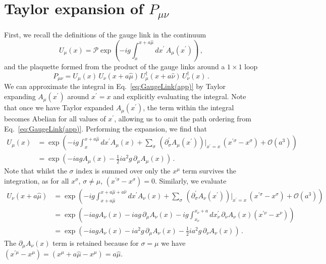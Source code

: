 \section{Taylor expansion of $P_{\mu\nu}$}\label{app:TEPlaquette}
First, we recall the definitions of the gauge link in the continuum
%
\begin{equation}
U_\mu(x) = \mathcal{P}\exp\left(-ig\int_x^{x+a\hat{\mu}}dx^\prime \, A_\mu(x^\prime)\right)  \, ,
\label{eq:GaugeLink(app)}
\end{equation}
%
and the plaquette formed from the product of the gauge links around a $1\times 1$ loop
\begin{equation}
P_{\mu\nu} = U_\mu(x)\,U_\nu(x+a\hat{\mu})\,U^\dagger_\mu(x+a\hat{\nu})\,U^\dagger_\nu(x)\, .
\label{eq:Plaquette(app)}
\end{equation}
%
We can approximate the integral in Eq.~\eqref{eq:GaugeLink(app)} by Taylor expanding $A_\mu(x^\prime)$ around $x^\prime=x$ and explicitly evaluating the integral. Note that once we have Taylor expanded $A_\mu(x^\prime)$, the term within the integral becomes Abelian for all values of $x^\prime$, allowing us to omit the path ordering from Eq.~\eqref{eq:GaugeLink(app)}. Performing the expansion, we find that
%
\begin{align}
U_\mu(x)&=\exp\left(-ig\int_x^{x+a\hat{\mu}} dx^\prime A_\mu\left(x\right) + \sum_\sigma \, \left(\partial^\prime_\sigma A_\mu(x^\prime)\right)\big|_{x^\prime = x}\,(x^{\prime\sigma} - x^\sigma) + \mathcal{O}(a^3)\right)\nonumber\\
&=\exp\left(-iag A_\mu\left(x\right) - \frac{1}{2}ia^2 g\, \partial_\mu A_\mu\left(x\right)\right)\, . \label{eq:UTaylor}
\end{align}
%
Note that whilst the $\sigma$ index is summed over only the $x^\mu$ term survives the integration, as for all $x^\sigma$, $\sigma\neq \mu$, $(x^{\prime\sigma}-x^\sigma)=0$. Similarly, we evaluate
%
\begin{align}
U_\nu(x+a\hat{\mu}) &= \exp\left(-ig\int_{x+a\hat{\mu}}^{x+a\hat{\mu}+a\hat{\nu}} dx^\prime A_\nu\left(x\right) + \sum_\sigma\,\left(\partial^\prime_\sigma A_\nu(x^\prime)\right)\big|_{x^\prime = x}\,(x^{\prime\sigma} - x^\sigma) + \mathcal{O}(a^3)\right)\nonumber\\
&= \exp\left( -iag A_\nu(x) - iag\,\partial_\mu A_\nu (x) - ig\int_{x_\nu}^{x_\nu+a} dx^\prime_\nu \, \partial_\nu A_\nu (x) (x^{\prime\nu} - x^\nu)\right)\nonumber\\
&= \exp\left(-iag A_\nu(x) - ia^2g\,\partial_\mu A_\nu(x) - \frac{1}{2}ia^2 g\,\partial_\nu A_\nu(x)\right)\, . \label{eq:UTaylor2}
\end{align}
%
The $\partial_\mu A_\nu (x)$ term is retained because for $\sigma = \mu$ we have $(x^{\prime\mu} - x^\mu) = (x^\mu + a\hat{\mu} - x^\mu) = a\hat{\mu}$.\\

